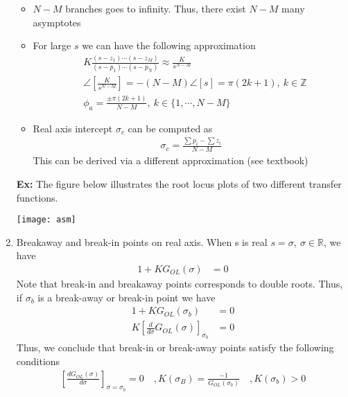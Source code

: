 \documentclass[twoside]{article}
\begin{document}
\begin{enumerate}
\begin{itemize}
  \item $N-M$ branches goes to infinity. Thus, there exist $N-M$ many
    asymptotes
  \item For large $s$ we can have the following approximation
 \begin{align*}
  &K \frac{(s - z_1) \cdots (s - z_M)}{(s - p_1) \cdots (s - p_N)}
   \approx \frac{K}{s^{N-M}}
\\
&\angle \left[ \frac{K}{s^{N-M}} \right] = -(N-M) \angle [ s ] = \pi (2 k + 1), \ k \in \mathbb{Z} 
\\
&\phi_{a} = \frac{\pm \pi (2 k + 1)}{N-M}, \ k \in \lbrace 1, \cdots, N-M \rbrace
 \end{align*}
%
  \item Real axis intercept $\sigma_c$ can be computed as
 \begin{align*}
   \sigma_c = \frac{\sum p_i - \sum z_i}{N-M}
 \end{align*}
%
This can be derived via a different approximation (see textbook)
\end{itemize}

\newpage

\textbf{Ex:} The figure below illustrates the root locus plots
of two different transfer functions.

\begin{center}
\begin{minipage}[h]{0.9\linewidth}
    \begin{center}
      \texttt{[image: asm]}
    \end{center}
\end{minipage}
\end{center}

\item Breakaway and break-in points on real axis. When s is real 
$s = \sigma, \ \sigma \in \mathbb{R}$, we have
%
\begin{align*}
1 + K G_{OL} (\sigma) &= 0 
\end{align*}
%
Note that break-in and breakaway points corresponds to 
double roots. Thus, if $\sigma_{b}$ is a break-away or break-in 
point we have 
%
\begin{align*}
1 + K G_{OL} (\sigma_b) &= 0 
\\
K \left[ \frac{d}{d \sigma} G_{OL}(\sigma) \right]_{\sigma_b} &= 0
\end{align*}
%
Thus, we conclude that break-in or break-away points satisfy
the following conditions
%
%
\begin{align*}
\left[ \frac{d G_{OL}(\sigma)}{d \sigma} \right]_{\sigma = \sigma_b} = 0
\quad ,
K(\sigma_B) = \frac{-1}{G_{OL} (\sigma_b) }
\quad ,
K(\sigma_b) > 0
\end{align*}


\end{enumerate}
\end{document}
